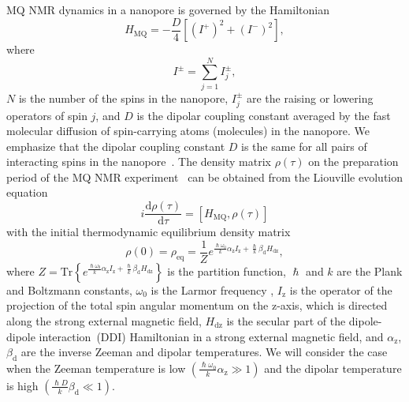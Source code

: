 \documentclass[review]{elsarticle}
\begin{document}
MQ NMR dynamics in a nanopore is governed by the Hamiltonian~\cite{Doronin_2019,Doronin_2009} 
%
\begin{equation}
    \label{eq:1}
    H_{\mathrm{MQ}} = - \dfrac{D}{4} \left[
        \left(I^{+}\right)^{2} 
        + \left(I^{-}\right)^{2} 
    \right] ,
\end{equation}
%
where 
%
\begin{equation}
    \label{eq:2}
    I^{\pm} = \sum\limits_{j=1}^{N} I_{j}^{\pm},
\end{equation}
%
$N$ is the number of the spins in the nanopore, $I^{\pm}_{j}$ are the raising or lowering operators of spin $j$, and $D$ is the dipolar coupling constant averaged by the fast molecular diffusion of spin-carrying atoms (molecules) in the nanopore.
We emphasize that the dipolar coupling constant $D$ is the same for all pairs of interacting spins in the nanopore~\cite{Doronin_2019,Doronin_2009}.
The density matrix $\rho(\tau)$ on the preparation period of the MQ NMR experiment~\cite{Baum_1985} can be obtained from the Liouville evolution equation~\cite{Goldman_1970,Abragam_1982} 
%
\begin{equation}
    \label{eq:3}
    i\dfrac{\mathrm{d}\rho(\tau)}{\mathrm{d}\tau} = \left[
    H_\mathrm{MQ},\rho(\tau)
    \right]
\end{equation}
%
with the initial thermodynamic equilibrium density matrix 
%
\begin{equation}
    \label{eq:4}
       \rho(0) = \rho_\mathrm{eq} = \dfrac{1}{Z}
       e^{
		   \frac{\hslash \omega_{0}}{k} \alpha_\mathrm{z} I_\mathrm{z} 
            + \frac{\hslash }{k} \beta_\mathrm{d} H_\mathrm{dz}
        },
\end{equation}
%
where 
$Z = \mathrm{Tr} \left\{ e^{\frac{\hslash \omega_{0}}{k} \alpha_\mathrm{z} I_\mathrm{z} + \frac{\hslash  }{k} \beta_\mathrm{d} H_\mathrm{dz}} \right\}$ is the partition function, 
$\hslash$ and $k$ are the Plank and Boltzmann constants, 
$\omega_{0}$  is the Larmor frequency , $I_\mathrm{z}$ is the operator of the projection of the total spin angular momentum on the z-axis, 
which is directed along the strong external magnetic field,  
$H_\mathrm{dz}$ is the secular part of the dipole-dipole interaction~(DDI) Hamiltonian in a strong external magnetic field, and $\alpha_\mathrm{z}$, $\beta_\mathrm{d}$ are the inverse Zeeman and dipolar temperatures. 
We will consider the case when the Zeeman temperature is low $({\frac{\hslash \omega_{0}}{k} \alpha_\mathrm{z}}\gg 1)$ 
and the dipolar temperature is high $\left( \frac{\hslash{D}}{k}\beta_\mathrm{d} \ll 1\right)$.
\end{document}
